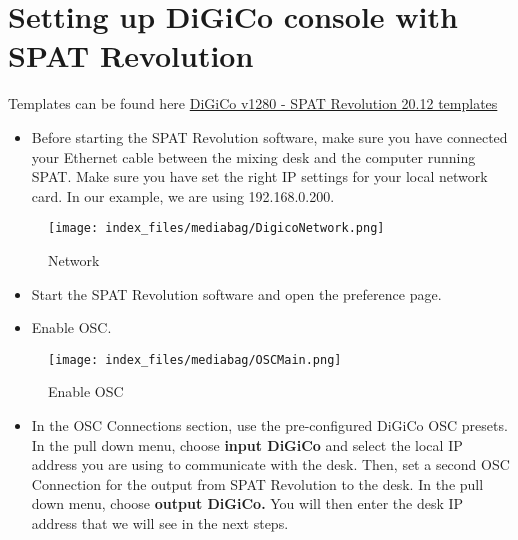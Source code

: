 \documentclass[
  letterpaper,
  DIV=11,
  numbers=noendperiod]{scrreport}
\providecommand{\tightlist}{%
  \setlength{\itemsep}{0pt}\setlength{\parskip}{0pt}}\usepackage{longtable,booktabs,array}
\begin{document}
\hypertarget{setting-up-digico-console-with-spat-revolution}{%
\chapter{Setting up DiGiCo console with SPAT
Revolution}\label{setting-up-digico-console-with-spat-revolution}}

Templates can be found here
\href{https://public.3.basecamp.com/p/84sDispYRgMSyX1WQVDwMzxT}{DiGiCo
v1280 - SPAT Revolution 20.12 templates}

\begin{itemize}
\tightlist
\item
  Before starting the SPAT Revolution software, make sure you have
  connected your Ethernet cable between the mixing desk and the computer
  running SPAT. Make sure you have set the right IP settings for your
  local network card. In our example, we are using 192.168.0.200.
\end{itemize}

\begin{figure}

{\centering \texttt{[image: index\_files/mediabag/DigicoNetwork.png]}

}

\caption{Network}

\end{figure}

\begin{itemize}
\tightlist
\item
  Start the SPAT Revolution software and open the preference page.
\item
  Enable OSC.
\end{itemize}

\begin{figure}

{\centering \texttt{[image: index\_files/mediabag/OSCMain.png]}

}

\caption{Enable OSC}

\end{figure}

\begin{itemize}
\tightlist
\item
  In the OSC Connections section, use the pre-configured DiGiCo OSC
  presets. In the pull down menu, choose \textbf{input \textbar{}
  DiGiCo} and select the local IP address you are using to communicate
  with the desk. Then, set a second OSC Connection for the output from
  SPAT Revolution to the desk. In the pull down menu, choose
  \textbf{output \textbar{} DiGiCo.} You will then enter the desk IP
  address that we will see in the next steps.
\end{itemize}
\end{document}
